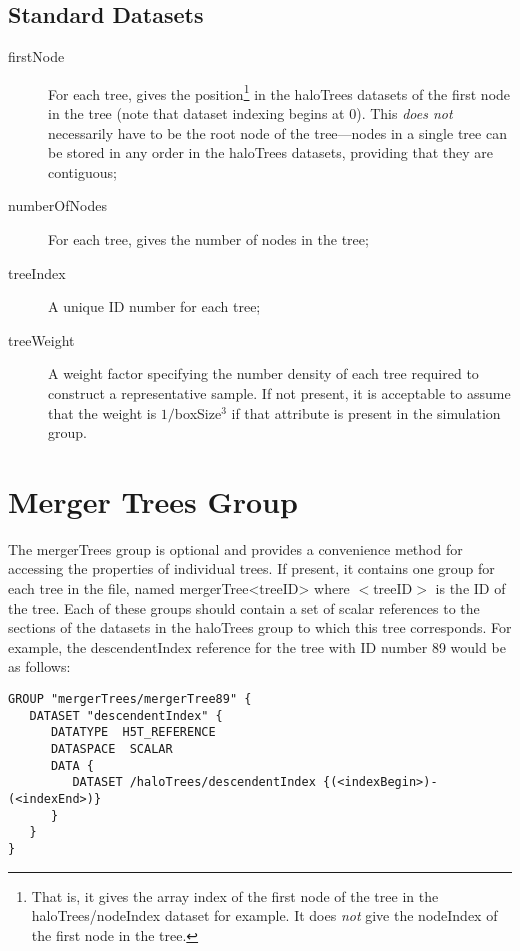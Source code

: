 \subsection{Standard Datasets}

\begin{description}
 \item [{\normalfont \ttfamily firstNode}] For each tree, gives the position\footnote{That is, it gives the array index of the first node of the tree in the {\normalfont \ttfamily haloTrees/nodeIndex} dataset for example. It does \emph{not} give the {\normalfont \ttfamily nodeIndex} of the first node in the tree.} in the {\normalfont \ttfamily haloTrees} datasets of the first node in the tree (note that dataset indexing begins at 0). This \emph{does not} necessarily have to be the root node of the tree---nodes in a single tree can be stored in any order in the {\normalfont \ttfamily haloTrees} datasets, providing that they are contiguous;
 \item [{\normalfont \ttfamily numberOfNodes}] For each tree, gives the number of nodes in the tree;
 \item [{\normalfont \ttfamily treeIndex}] A unique ID number for each tree;
 \item [{\normalfont \ttfamily treeWeight}] A weight factor specifying the number density of each tree required to construct a representative sample. If not present, it is acceptable to assume that the weight is $1/${\normalfont \ttfamily boxSize}$^3$ if that attribute is present in the {\normalfont \ttfamily simulation} group.
\end{description}

\section{Merger Trees Group}

The {\normalfont \ttfamily mergerTrees} group is optional and provides a convenience method for accessing the properties of individual trees. If present, it contains one group for each tree in the file, named {\normalfont \ttfamily mergerTree<treeID>} where {\normalfont \ttfamily $<$treeID$>$} is the ID of the tree. Each of these groups should contain a set of scalar references to the sections of the datasets in the {\normalfont \ttfamily haloTrees} group to which this tree corresponds. For example, the {\normalfont \ttfamily descendentIndex} reference for the tree with ID number 89 would be as follows:

\begin{verbatim}
GROUP "mergerTrees/mergerTree89" {
   DATASET "descendentIndex" {
      DATATYPE  H5T_REFERENCE
      DATASPACE  SCALAR
      DATA {
         DATASET /haloTrees/descendentIndex {(<indexBegin>)-(<indexEnd>)}
      }
   }
}
\end{verbatim}

